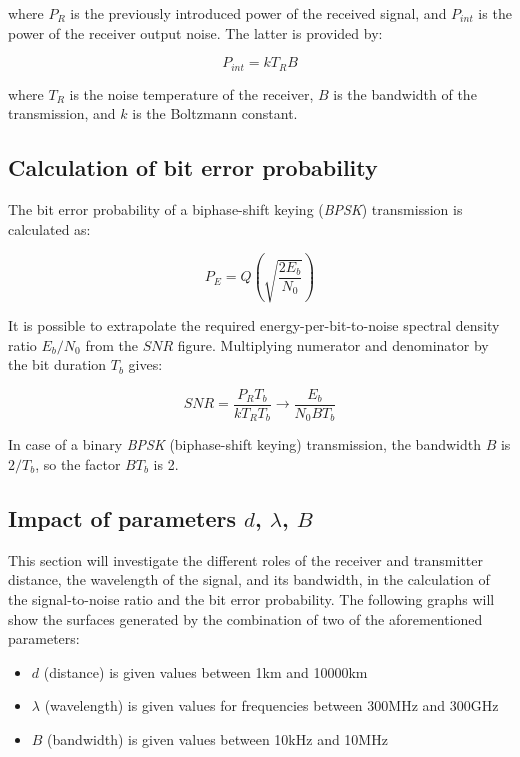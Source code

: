 where $P_R$ is the previously introduced power of the received signal, and $P_{int}$ is the power of the receiver output noise.
The latter is provided by:

\begin{equation}
	P_{int} = k T_R B
\end{equation}

where $T_R$ is the noise temperature of the receiver, $B$ is the bandwidth of the transmission, and $k$ is the Boltzmann constant.


\subsection{Calculation of bit error probability}
The bit error probability of a biphase-shift
keying (\emph{BPSK}) transmission is calculated as:

\begin{equation}
	P_E = Q\left(\sqrt{\frac{2E_b}{N_0}}\right)
\end{equation}

It is possible to extrapolate the required energy-per-bit-to-noise spectral density ratio $E_b/N_0$ from the $SNR$ figure.
Multiplying numerator and denominator by the bit duration $T_b$ gives:

\begin{equation}
	SNR = \frac{P_R T_b}{k T_R T_b} \rightarrow \frac{E_b}{N_0 B T_b}
\end{equation}

In case of a binary \emph{BPSK} (biphase-shift
keying) transmission, the bandwidth $B$ is $2/T_b$, so the factor $B T_b$ is 2.


\subsection{Impact of parameters $d$, $\lambda$, $B$}
This section will investigate the different roles of the receiver and transmitter distance, the wavelength of the signal, and its bandwidth, in the calculation of the signal-to-noise ratio and the bit error probability.
The following graphs will show the surfaces generated by the combination of two of the aforementioned parameters:

\begin{itemize}
	\item $d$ (distance) is given values between 1km and 10000km
	\item $\lambda$ (wavelength) is given values for frequencies between 300MHz and 300GHz
	\item $B$ (bandwidth) is given values between 10kHz and 10MHz
\end{itemize}

